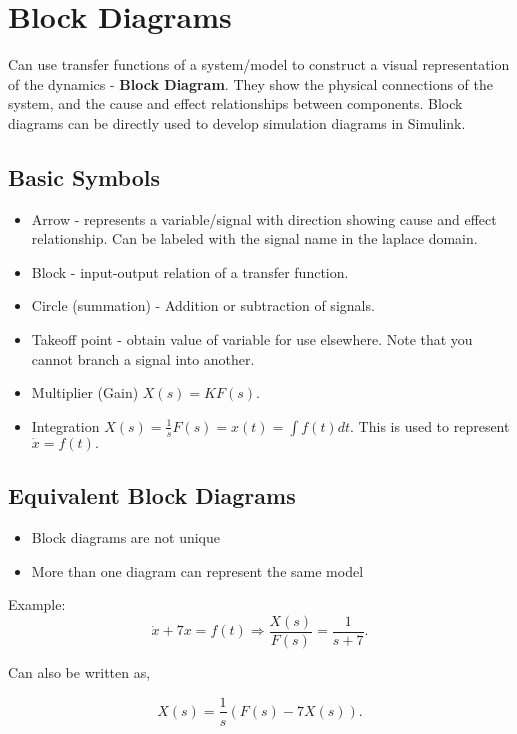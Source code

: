 \documentclass[12pt, a4paper]{report}
\begin{document}
  \section{Block Diagrams}

  Can use transfer functions of a system/model to construct a visual representation of the dynamics - \textbf{Block Diagram}. They show the physical connections of the system, and the cause and effect relationships between components. Block diagrams can be directly used to develop simulation diagrams in Simulink.

  \subsection{Basic Symbols}

  \begin{itemize}
    \item Arrow - represents a variable/signal with direction showing cause and effect relationship. Can be labeled with the signal name in the laplace domain.
    \item Block - input-output relation of a transfer function.
    \item Circle (summation) - Addition or subtraction of signals.
    \item Takeoff point - obtain value of variable for use elsewhere. Note that you cannot branch a signal into another.
    \item Multiplier (Gain) $ X(s) = KF(s). $
    \item Integration  $ X(s) = \frac{1}{s}F(s) = x(t) = \int f(t)dt. $ This is used to represent $ \dot x = f(t). $
  \end{itemize}

  \subsection{Equivalent Block Diagrams}

  \begin{itemize}
    \item Block diagrams are not unique
    \item More than one diagram can represent the same model
  \end{itemize}
  Example:
  \[
      \dot x + 7x = f(t) \Rightarrow \frac{X(s)}{F(s)} = \frac{1}{s+7}
    .\]

  Can also be written as,

  \[
      X(s) = \frac{1}{s} \left( F(s) - 7X(s) \right)
    .\]
\end{document}
